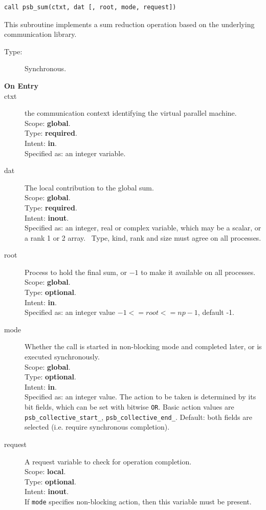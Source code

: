 \begin{verbatim}
call psb_sum(ctxt, dat [, root, mode, request])
\end{verbatim}

This subroutine implements a sum reduction  operation based on the
underlying communication library. 
\begin{description}
\item[Type:] Synchronous.
\item[\bf  On Entry ]
\item[ctxt] the communication context identifying the virtual
  parallel machine.\\
Scope: {\bf global}.\\
Type: {\bf required}.\\
Intent: {\bf in}.\\
Specified as: an integer variable.
\item[dat] The local contribution to the global sum.\\
Scope: {\bf global}.\\
Type: {\bf required}.\\
Intent: {\bf inout}.\\
Specified as: an integer, real or complex variable, which may be a
scalar, or a rank 1 or 2 array. \
Type, kind, rank and size must agree on all processes.
\item[root] Process to hold the final sum, or $-1$ to make it available
  on all processes.\\
Scope: {\bf global}.\\
Type: {\bf optional}.\\
Intent: {\bf in}.\\
Specified as: an integer value $-1<= root <= np-1$, default -1. \
\item[mode] Whether the call is started in non-blocking mode and completed
  later, or is executed synchronously.\\
Scope: {\bf global}.\\
Type: {\bf optional}.\\
Intent: {\bf in}.\\
Specified as: an integer value. The action to be taken is determined
by its bit fields, which can be set with bitwise \verb|OR|. Basic
action values are \verb|psb_collective_start_|, \verb|psb_collective_end_|.
Default:  both fields are selected (i.e. require synchronous completion).\\
\item[request] A request variable to check for operation completion.\\
Scope: {\bf local}.\\
Type: {\bf optional}.\\
Intent: {\bf inout}.\\
If \verb|mode| specifies non-blocking action, then this
variable must be present.
\end{description}


